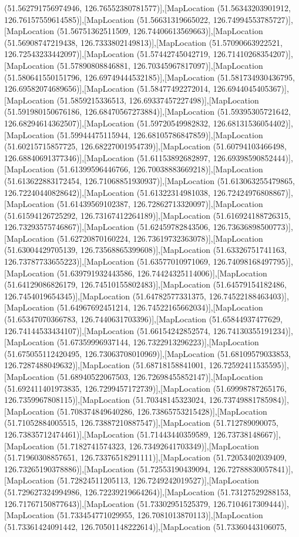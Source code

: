(51.562791756974946, 126.76552380781577)],[MapLocation (51.56343203901912, 126.76157559614585)],[MapLocation (51.56631319665022, 126.74994553785727)],[MapLocation (51.56751362511509, 126.74406613569663)],[MapLocation (51.56908747219438, 126.7333802149813)],[MapLocation (51.57090663922521, 126.72543233442097)],[MapLocation (51.57442745042719, 126.71410268354207)],[MapLocation (51.57890808846881, 126.70345967817097)],[MapLocation (51.580641550151796, 126.69749444532185)],[MapLocation (51.581734930436795, 126.69582074689656)],[MapLocation (51.58477492272014, 126.6944045405367)],[MapLocation (51.5859215336513, 126.69337457227498)],[MapLocation (51.591980150676186, 126.68470567273884)],[MapLocation (51.59395305721642, 126.68294614362507)],[MapLocation (51.59720549982832, 126.68131536054402)],[MapLocation (51.59944475115944, 126.68105786847859)],[MapLocation (51.60215715857725, 126.68227001954739)],[MapLocation (51.60794103466498, 126.68840691377346)],[MapLocation (51.61153892682897, 126.69398590852444)],[MapLocation (51.61399596446766, 126.70038883669218)],[MapLocation (51.613622883172454, 126.71068851930937)],[MapLocation (51.613063255479865, 126.72240440828642)],[MapLocation (51.61322314981038, 126.72424976808867)],[MapLocation (51.61439569102387, 126.72862713320097)],[MapLocation (51.61594126725292, 126.73167412264189)],[MapLocation (51.616924188726315, 126.73293575746867)],[MapLocation (51.62459782843506, 126.73636898500773)],[MapLocation (51.62720870160224, 126.73619732363078)],[MapLocation (51.63004429705139, 126.73568865399608)],[MapLocation (51.63326751741163, 126.73787733655223)],[MapLocation (51.63577010971069, 126.74098168497795)],[MapLocation (51.639791932443586, 126.74424325114006)],[MapLocation (51.64129086826179, 126.74510155802483)],[MapLocation (51.64579154182486, 126.7454019654345)],[MapLocation (51.64782577331375, 126.74522188463403)],[MapLocation (51.64967692451214, 126.74522165662034)],[MapLocation (51.65347070366783, 126.7440631703396)],[MapLocation (51.65844937477629, 126.74144533434107)],[MapLocation (51.66154242852574, 126.74130355191234)],[MapLocation (51.67359996937144, 126.7322913296223)],[MapLocation (51.675055112420495, 126.73063708010969)],[MapLocation (51.68109579033853, 126.7287488049632)],[MapLocation (51.68718158841001, 126.72592411535595)],[MapLocation (51.68940522067503, 126.72698455852147)],[MapLocation (51.692411401973835, 126.7299457172739)],[MapLocation (51.69998787265176, 126.7359967808115)],[MapLocation (51.70348145323024, 126.73749881785984)],[MapLocation (51.708374849640286, 126.73865753215428)],[MapLocation (51.71052884005515, 126.73887210887547)],[MapLocation (51.712789090075, 126.73835712474461)],[MapLocation (51.71443440359589, 126.73738148667)],[MapLocation (51.7182741574323, 126.73492641703349)],[MapLocation (51.71960308857651, 126.73376518291111)],[MapLocation (51.72053402039409, 126.73265190378886)],[MapLocation (51.72553190439094, 126.72788830057841)],[MapLocation (51.72824511205113, 126.7249242019527)],[MapLocation (51.729627324994986, 126.72239219664264)],[MapLocation (51.73127529288153, 126.71767150877643)],[MapLocation (51.73302951525379, 126.7104617309444)],[MapLocation (51.733454771029955, 126.7081013870113)],[MapLocation (51.73361424091442, 126.70501148222614)],[MapLocation (51.73360443106075, 
